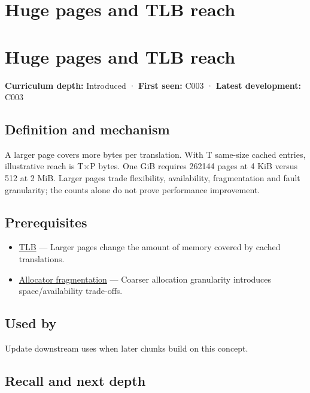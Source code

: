\hypertarget{appendix-ce688d1acdab}{}
\section*{Huge pages and TLB reach}
\section{Huge pages and TLB reach}\label{huge-pages-and-tlb-reach}

\textbf{Curriculum depth:} Introduced · \textbf{First seen:} C003 · \textbf{Latest development:} C003

\subsection{Definition and mechanism}\label{definition-and-mechanism}

A larger page covers more bytes per translation. With T same-size cached entries, illustrative reach is T×P bytes. One GiB requires 262144 pages at 4 KiB versus 512 at 2 MiB. Larger pages trade flexibility, availability, fragmentation and fault granularity; the counts alone do not prove performance improvement.

\subsection{Prerequisites}\label{prerequisites}

\begin{itemize}
\tightlist
\item
  \hyperref[appendix-7a2d9c5ce511]{TLB} --- Larger pages change the amount of memory covered by cached translations.
\item
  \hyperref[appendix-a7c50686d81f]{Allocator fragmentation} --- Coarser allocation granularity introduces space/availability trade-offs.
\end{itemize}

\subsection{Used by}\label{used-by}

Update downstream uses when later chunks build on this concept.

\subsection{Recall and next depth}\label{recall-and-next-depth}

